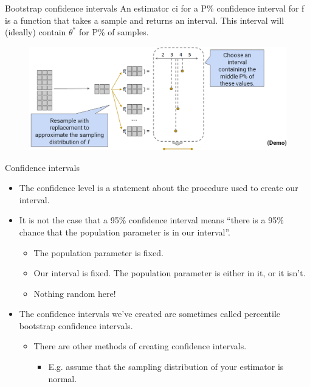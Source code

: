 \documentclass[aspectratio=169]{../latex_main/tntbeamer}  %
\begin{document}
	\begin{frame}{Bootstrap confidence intervals}
	    An estimator ci for a P\% confidence interval for f is a function that takes a sample and returns an interval. This interval will (ideally) contain $\theta^*$ for P\% of samples.
	    \begin{figure}
	        \centering
	        \includegraphics[scale=.35]{Bild9}
	    \end{figure}
	\end{frame}
	
	
	\begin{frame}{Confidence intervals}
	    \begin{itemize}
	        \item The confidence level is a statement about the procedure used to create our interval.
	        \item It is not the case that a 95\% confidence interval means “there is a 95\% chance that the population parameter is in our interval”.
	        \begin{itemize}
	            \item The population parameter is fixed.
	            \item Our interval is fixed. The population parameter is either in it, or it isn’t.
	            \item Nothing random here!
	        \end{itemize}
	        \item The confidence intervals we’ve created are sometimes called percentile bootstrap confidence intervals.
	        \begin{itemize}
	            \item There are other methods of creating confidence intervals.
	            \begin{itemize}
	                \item E.g. assume that the sampling distribution of your estimator is normal.
	            \end{itemize}
	        \end{itemize}
	    \end{itemize}
	\end{frame}
\end{document}
